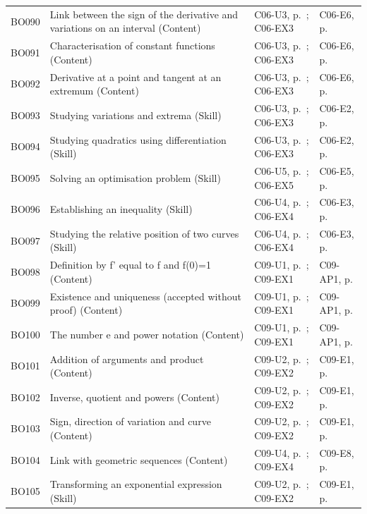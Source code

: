 \begin{longtable}{p{.1\linewidth}p{.43\linewidth}p{.19\linewidth}p{.16\linewidth}}
BO090 & Link between the sign of the derivative and variations on an interval (Content) & C06-U3, p.\,\pageref{C06-U3} ; C06-EX3 & C06-E6, p.\,\pageref{C06-E6} \\
BO091 & Characterisation of constant functions (Content) & C06-U3, p.\,\pageref{C06-U3} ; C06-EX3 & C06-E6, p.\,\pageref{C06-E6} \\
BO092 & Derivative at a point and tangent at an extremum (Content) & C06-U3, p.\,\pageref{C06-U3} ; C06-EX3 & C06-E6, p.\,\pageref{C06-E6} \\
BO093 & Studying variations and extrema (Skill) & C06-U3, p.\,\pageref{C06-U3} ; C06-EX3 & C06-E2, p.\,\pageref{C06-E2} \\
BO094 & Studying quadratics using differentiation (Skill) & C06-U3, p.\,\pageref{C06-U3} ; C06-EX3 & C06-E2, p.\,\pageref{C06-E2} \\
BO095 & Solving an optimisation problem (Skill) & C06-U5, p.\,\pageref{C06-U5} ; C06-EX5 & C06-E5, p.\,\pageref{C06-E5} \\
BO096 & Establishing an inequality (Skill) & C06-U4, p.\,\pageref{C06-U4} ; C06-EX4 & C06-E3, p.\,\pageref{C06-E3} \\
BO097 & Studying the relative position of two curves (Skill) & C06-U4, p.\,\pageref{C06-U4} ; C06-EX4 & C06-E3, p.\,\pageref{C06-E3} \\
BO098 & Definition by f' equal to f and f(0)=1 (Content) & C09-U1, p.\,\pageref{C09-U1} ; C09-EX1 & C09-AP1, p.\,\pageref{C09-AP1} \\
BO099 & Existence and uniqueness (accepted without proof) (Content) & C09-U1, p.\,\pageref{C09-U1} ; C09-EX1 & C09-AP1, p.\,\pageref{C09-AP1} \\
BO100 & The number e and power notation (Content) & C09-U1, p.\,\pageref{C09-U1} ; C09-EX1 & C09-AP1, p.\,\pageref{C09-AP1} \\
BO101 & Addition of arguments and product (Content) & C09-U2, p.\,\pageref{C09-U2} ; C09-EX2 & C09-E1, p.\,\pageref{C09-E1} \\
BO102 & Inverse, quotient and powers (Content) & C09-U2, p.\,\pageref{C09-U2} ; C09-EX2 & C09-E1, p.\,\pageref{C09-E1} \\
BO103 & Sign, direction of variation and curve (Content) & C09-U2, p.\,\pageref{C09-U2} ; C09-EX2 & C09-E1, p.\,\pageref{C09-E1} \\
BO104 & Link with geometric sequences (Content) & C09-U4, p.\,\pageref{C09-U4} ; C09-EX4 & C09-E8, p.\,\pageref{C09-E8} \\
BO105 & Transforming an exponential expression (Skill) & C09-U2, p.\,\pageref{C09-U2} ; C09-EX2 & C09-E1, p.\,\pageref{C09-E1} \\

\end{longtable}
